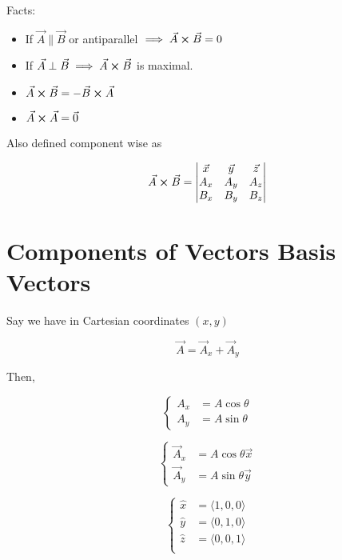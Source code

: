 Facts:

\begin{itemize}
	\item If $\vec A \parallel \vec B$ or antiparallel $\implies \vec A \cross \vec B = 0$
	\item If $\vec A \perp \vec B \implies \vec A \cross \vec B$ is maximal.
	\item $\vec A \cross \vec B = - \vec B \cross \vec A$
	\item $\vec A \cross \vec A = \vec 0$
\end{itemize}

Also defined component wise as

\begin{equation}
	\vec A \cross \vec B = \begin{vmatrix}
		\vec x & \vec y & \vec z\\
		A_x & A_y & A_z\\
		B_x & B_y & B_z\\
	\end{vmatrix}
\end{equation}

\section{Components of Vectors Basis Vectors}

Say we have in Cartesian coordinates $(x, y)$

\begin{equation}
	\vec A = \vec A_x + \vec A_y
\end{equation}

Then,

\begin{equation}
	\begin{cases}
		A_x &= A\cos\theta\\
		A_y &= A\sin\theta
	\end{cases}
\end{equation}

\begin{equation}
	\begin{cases}
		\vec A_x &= A\cos\theta\vec x\\
		\vec A_y &= A\sin\theta\vec y
	\end{cases}
\end{equation}

\begin{equation}
	\begin{cases}
		\hat{x} &= \langle 1, 0, 0 \rangle\\
		\hat{y} &= \langle 0, 1, 0 \rangle\\
		\hat{z} &= \langle 0, 0, 1 \rangle\\
	\end{cases}
\end{equation}

